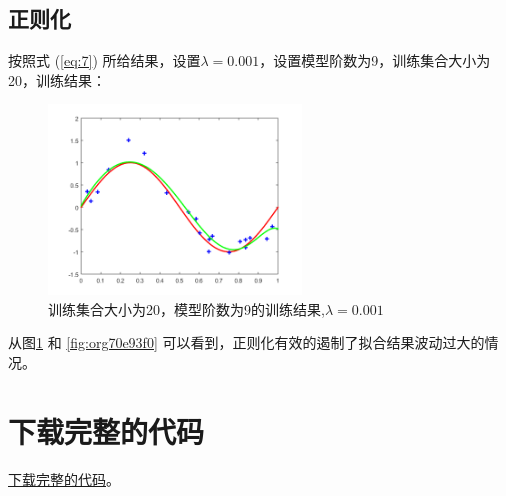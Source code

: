 \documentclass[10pt,a4paper,UTF8]{article}
\begin{document}
\subsection{正则化}
\label{sec:org8e48453}


按照式 (\ref{eq:7}) 所给结果，设置\(\lambda = 0.001\)，设置模型阶数为9，训练集合大小为20，训练结果：
\begin{figure}[htbp]
\centering
\includegraphics[width=0.6\textwidth]{../../img/computer_prml/20170521figure5.png}
\caption{\label{fig:org056b7ef}
训练集合大小为20，模型阶数为9的训练结果,\(\lambda = 0.001\)}
\end{figure}

从图\ref{fig:org056b7ef} 和 \ref{fig:org70e93f0} 可以看到，正则化有效的遏制了拟合结果波动过大的情况。

\section{下载完整的代码}
\label{sec:orge86e31b}


\href{curve\_fitting.m}{下载完整的代码}。
\end{document}
